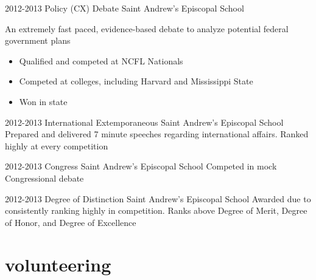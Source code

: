 \documentclass[]{friggeri-cv} %
\begin{document}
\begin{entrylist}


\entry
{2012-2013}
{Policy (CX) Debate}
{Saint Andrew's Episcopal School}
{An extremely fast paced, evidence-based debate to analyze potential federal government plans 
\begin{itemize} 
\item Qualified and competed at NCFL Nationals 
\item Competed at colleges, including Harvard and Mississippi State
\item Won  in state 
\end{itemize}
}


\entry
{2012-2013}
{International Extemporaneous}
{Saint Andrew's Episcopal School}
{Prepared and delivered 7 minute speeches regarding international affairs. Ranked highly at every competition}


\entry
{2012-2013}
{Congress}
{Saint Andrew's Episcopal School}
{Competed in mock Congressional debate}


\entry
{2012-2013}
{Degree of Distinction}
{Saint Andrew's Episcopal School}
{
Awarded due to consistently ranking highly in competition. Ranks above Degree of Merit, Degree of Honor, and Degree of Excellence}


\end{entrylist}


\section{volunteering}
\end{document}
